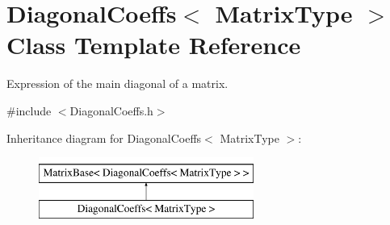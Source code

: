 \hypertarget{class_diagonal_coeffs}{\section{Diagonal\-Coeffs$<$ Matrix\-Type $>$ Class Template Reference}
\label{class_diagonal_coeffs}
}


Expression of the main diagonal of a matrix.  




{\ttfamily \#include $<$Diagonal\-Coeffs.\-h$>$}

Inheritance diagram for Diagonal\-Coeffs$<$ Matrix\-Type $>$\-:\begin{figure}[H]
\begin{center}
\leavevmode
\includegraphics[height=2.000000cm]{class_diagonal_coeffs}
\end{center}
\end{figure}
